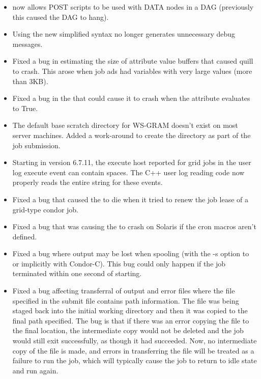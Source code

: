\begin{itemize}
\item {} now allows POST scripts to be used with DATA
nodes in a DAG (previously this caused the DAG to hang).

\item Using the new  simplified syntax no longer
generates unnecessary debug messages.

\item Fixed a bug in estimating the size of attribute value buffers that
caused quill to crash.  This arose when job ads had variables with very
large values (more than 3KB).  

\item Fixed a bug in the  that could cause it to crash
when the  attribute evaluates to True.

\item The default base scratch directory for WS-GRAM doesn't exist on most
server machines. Added a work-around to create the directory as part of the
job submission.

\item Starting in version 6.7.11, the execute host reported for grid jobs
in the user log execute event can contain spaces. The C++ user log reading
code now properly reads the entire string for these events.

\item Fixed a bug that caused the  to die when it 
tried to renew the job lease of a grid-type condor job.

\item Fixed a bug that was causing the  to crash on Solaris
if the cron macros aren't defined.

\item Fixed a bug where output may be lost when spooling (with the -s option to
 or implicitly with Condor-C).  This bug could only happen if
the job terminated within one second of starting.

\item Fixed a bug affecting transferral of output and error files where the
file specified in the submit file contains path information.  The file
was being staged back into the initial working directory and then it was
copied to the final path specified.  The bug is that if there was an error
copying the file to the final location, the intermediate copy would not
be deleted and the job would still exit successfully, as though it had
succeeded.  Now, no intermediate copy of the file is made, and errors
in transferring the file will be treated as a failure to run the job,
which will typically cause the job to return to idle state and run again.

\end{itemize}

